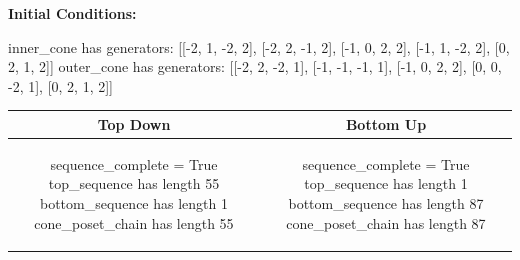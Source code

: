 \documentclass[10pt]{article}
\begin{document}
\textbf{Initial Conditions:}
\begin{SAGE}
inner_cone has generators: 
[[-2, 1, -2, 2], [-2, 2, -1, 2], [-1, 0, 2, 2], [-1, 1, -2, 2], [0, 2, 1, 2]]
outer_cone has generators: 
[[-2, 2, -2, 1], [-1, -1, -1, 1], [-1, 0, 2, 2], [0, 0, -2, 1], [0, 2, 1, 2]]

\end{SAGE}
\begin{tabular}{c|c}
\textbf{Top Down} & \textbf{Bottom Up} \\ \hline  
\begin{SAGE}
sequence_complete = True
top_sequence has length 55
bottom_sequence has length 1
cone_poset_chain has length 55
\end{SAGE} 
&
\begin{SAGE}
sequence_complete = True
top_sequence has length 1
bottom_sequence has length 87
cone_poset_chain has length 87
\end{SAGE} 
\\ \hline


\end{tabular}
\end{document}
